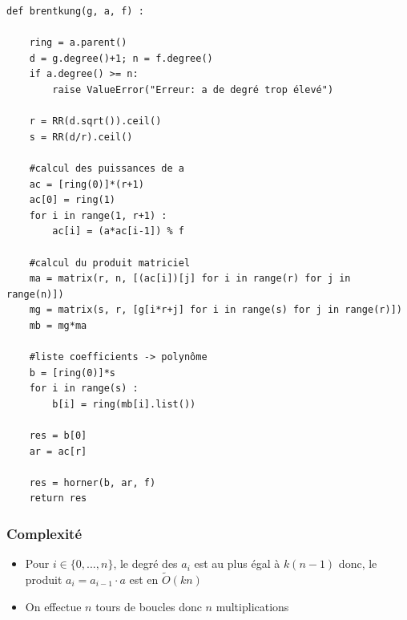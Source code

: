 \documentclass[a4paper]{article}
\begin{document}
\begin{lstlisting}[title={brent and kung}]
def brentkung(g, a, f) :

	ring = a.parent()
	d = g.degree()+1; n = f.degree()
	if a.degree() >= n:
		raise ValueError("Erreur: a de degré trop élevé")

	r = RR(d.sqrt()).ceil()
	s = RR(d/r).ceil()

    #calcul des puissances de a
	ac = [ring(0)]*(r+1)
	ac[0] = ring(1)
	for i in range(1, r+1) :
		ac[i] = (a*ac[i-1]) % f

    #calcul du produit matriciel
	ma = matrix(r, n, [(ac[i])[j] for i in range(r) for j in range(n)])
	mg = matrix(s, r, [g[i*r+j] for i in range(s) for j in range(r)])
	mb = mg*ma

    #liste coefficients -> polynôme
	b = [ring(0)]*s
	for i in range(s) :
		b[i] = ring(mb[i].list())

	res = b[0]
	ar = ac[r]

	res = horner(b, ar, f)
	return res
\end{lstlisting}

\subsubsection*{Complexité}
\begin{itemize}
    \item Pour $i \in \{0,...,n\}$, le degré des $a_i$ est au plus égal à $k(n-1)$ donc, le produit $a_i=a_{i-1}\cdot a$ est en $\tilde{O}(kn)$
    \item On effectue $n$ tours de boucles donc $n$ multiplications
\end{itemize}

\newpage
\end{document}
